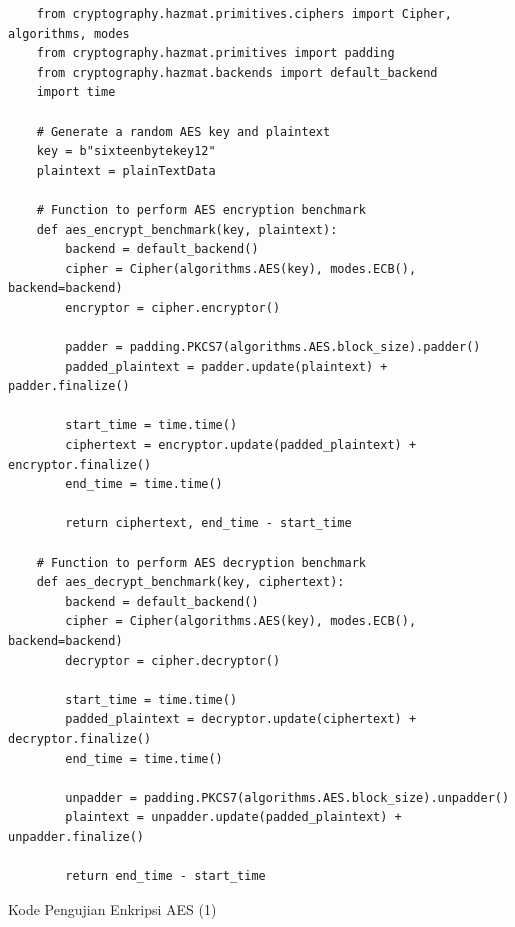 \begin{listing}[H]
    \begin{verbatim}
    from cryptography.hazmat.primitives.ciphers import Cipher, algorithms, modes
    from cryptography.hazmat.primitives import padding
    from cryptography.hazmat.backends import default_backend
    import time

    # Generate a random AES key and plaintext
    key = b"sixteenbytekey12"
    plaintext = plainTextData

    # Function to perform AES encryption benchmark
    def aes_encrypt_benchmark(key, plaintext):
        backend = default_backend()
        cipher = Cipher(algorithms.AES(key), modes.ECB(), backend=backend)
        encryptor = cipher.encryptor()

        padder = padding.PKCS7(algorithms.AES.block_size).padder()
        padded_plaintext = padder.update(plaintext) + padder.finalize()

        start_time = time.time()
        ciphertext = encryptor.update(padded_plaintext) + encryptor.finalize()
        end_time = time.time()

        return ciphertext, end_time - start_time

    # Function to perform AES decryption benchmark
    def aes_decrypt_benchmark(key, ciphertext):
        backend = default_backend()
        cipher = Cipher(algorithms.AES(key), modes.ECB(), backend=backend)
        decryptor = cipher.decryptor()

        start_time = time.time()
        padded_plaintext = decryptor.update(ciphertext) + decryptor.finalize()
        end_time = time.time()

        unpadder = padding.PKCS7(algorithms.AES.block_size).unpadder()
        plaintext = unpadder.update(padded_plaintext) + unpadder.finalize()

        return end_time - start_time
    \end{verbatim}
    \caption{Kode Pengujian Enkripsi AES (1)}
    \label{code:pengujian_enkripsi_aes_1}
\end{listing}

